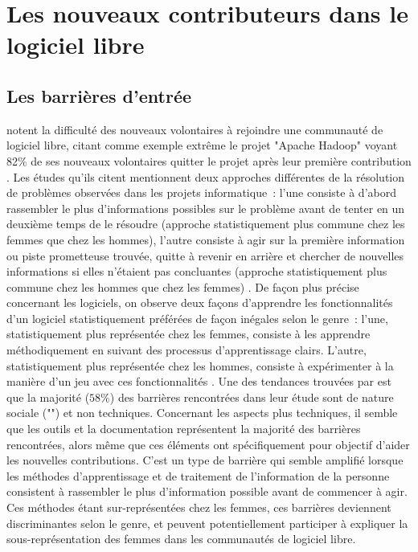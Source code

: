 \section{Les nouveaux contributeurs dans le logiciel libre}

\subsection{Les barrières d'entrée}

 notent la difficulté des nouveaux volontaires à rejoindre une communauté de
logiciel libre, citant comme exemple extrême le projet "Apache Hadoop" voyant 82\% de ses nouveaux volontaires
quitter le projet après leur première contribution . Les études qu'ils
citent mentionnent deux approches différentes de la résolution de problèmes observées dans les projets
informatique : l'une consiste à d'abord rassembler le plus d'informations possibles sur le problème avant de
tenter en un deuxième temps de le résoudre (approche statistiquement plus commune chez les femmes que chez les
hommes), l'autre consiste à agir sur la première information ou piste prometteuse trouvée, quitte à revenir en
arrière et chercher de nouvelles informations si elles n'étaient pas concluantes (approche statistiquement
plus commune chez les hommes que chez les femmes)
. De façon plus précise
concernant les logiciels, on observe deux façons d'apprendre les fonctionnalités d'un logiciel statistiquement
préférées de façon inégales selon le genre : l'une, statistiquement plus représentée chez les femmes, consiste
à les apprendre méthodiquement en suivant des processus d'apprentissage clairs. L'autre, statistiquement plus
représentée chez les hommes, consiste à expérimenter à la manière d'un jeu avec ces fonctionnalités
. Une des tendances trouvées par
\textcite[p.~1008]{barriers-2018} est que la majorité ($58\%$) des barrières rencontrées dans leur étude sont
de nature sociale ("") et non techniques. Concernant les aspects plus techniques, il
semble que les outils et la documentation représentent la majorité des barrières rencontrées, alors même que
ces éléments ont spécifiquement pour objectif d'aider les nouvelles contributions. C'est un type de barrière
qui semble amplifié lorsque les méthodes d'apprentissage et de traitement de l'information de la personne
consistent à rassembler le plus d'information possible avant de commencer à agir. Ces méthodes étant
sur-représentées chez les femmes, ces barrières deviennent discriminantes selon le genre, et peuvent
potentiellement participer à expliquer la sous-représentation des femmes dans les communautés de logiciel
libre.

